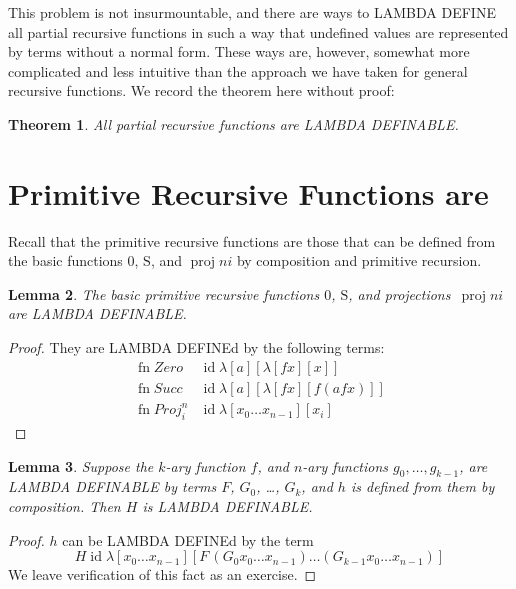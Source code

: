 \documentclass[10pt,a4paper]{article}
\newcommand*{\olup}[1]{\MakeUppercase{#1}}
\theoremstyle{plain}
\newtheorem{thm}{Theorem}[section]
\newtheorem{lem}[thm]{Lemma}
\theoremstyle{definition}
\theoremstyle{remark}
\newcommand*{\olfileid}[3]{}
\newcommand*{\olsection}[1]{\section*{#1}}
\newcommand*{\ollabel}[1]{\label{#1}}
\providecommand{\Zero}{\ensuremath{0}}
\providecommand{\Succ}{\ensuremath{\mathrm{S}}}
\providecommand{\lambd}{\ensuremath{\lambda}}
\providecommand{\Proj}{\operatorname{proj}}
\providecommand{\ident}{\operatorname{id}}
\providecommand{\fn}{\operatorname{fn}}
\begin{document}
This problem is not insurmountable, and there are ways to
\olup{lambda define} all partial recursive functions in such a way that
undefined values are represented by terms without a normal form.
These ways are, however, somewhat more complicated and less intuitive
than the approach we have taken for general recursive functions. We
record the theorem here without proof:

\begin{thm}
  All partial recursive functions are \olup{lambda definable}.
\end{thm}






\olfileid{lam}{ldf}{prf}
\olsection{Primitive Recursive Functions are \usetoken{S}{lambda definable}} 

Recall that the primitive recursive functions are those that can be
defined from the basic functions $\Zero$, $\Succ$, and $\Proj{n}{i}$
by composition and primitive recursion.

\begin{lem}
  \ollabel{lem:basic}
  The basic primitive recursive functions $\Zero$, $\Succ$, and
  projections~$\Proj{n}{i}$ are \olup{lambda definable}.
\end{lem}

\begin{proof}
They are \olup{lambda define}d by the following terms:
\begin{align*}
  \fn{Zero} & \ident \lambd[a][\lambd[fx][x]]\\
  \fn{Succ} & \ident \lambd[a][\lambd[fx][f (a f x)]] \\
  \fn{Proj}^n_i & \ident \lambd[x_0\dots x_{n-1}][x_i]
\end{align*}
\end{proof}

\begin{lem}
  \ollabel{lem:comp} Suppose the $k$-ary function $f$, and $n$-ary
  functions $g_0, \dots, g_{k-1}$, are \olup{lambda definable} by terms
  $F$, $G_0$, \dots, $G_k$, and $h$ is defined from them by composition.
  Then $H$ is \olup{lambda definable}.
\end{lem}

\begin{proof}
  $h$ can be \olup{lambda define}d by the term
  \[
  H \ident \lambd[x_0 \dots x_{n-1}][F\, (G_0 x_0 \dots
    x_{n-1}) \dots (G_{k-1} x_0 \dots x_{n-1})]
  \]
  We leave verification of this fact as an exercise.
\end{proof}
\end{document}

